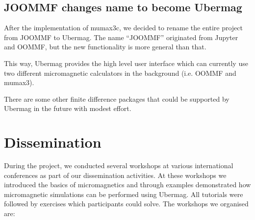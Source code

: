 \documentclass{deliverablereport}
\begin{document}
\subsection{JOOMMF changes name to become Ubermag}

After the implementation of mumax3c, we decided to rename the entire
project from JOOMMF to Ubermag. The name ``JOOMMF'' originated from
Jupyter and OOMMF, but the new functionality is more general than
that.

This way, Ubermag provides the high level user interface which can
currently use two different micromagnetic calculators in the
background (i.e. OOMMF and mumax3).

There are some other finite difference packages that could be supported by
Ubermag in the future with modest effort.

\section{Dissemination}

During the project, we conducted several workshops at various
international conferences as part of our dissemination activities. At
these workshops we introduced the basics of micromagnetics and through
examples demonstrated how micromagnetic simulations can be performed
using Ubermag. All tutorials were followed by exercises which
participants could solve. The workshops we organised are:
\end{document}
